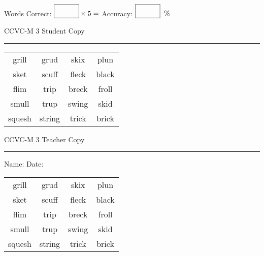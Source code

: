 \documentclass{memoir}
\begin{document}
\small

Words Correct: $\fbox{\phantom{\huge 100}} \times 5 = $ Accuracy: $\fbox{\phantom{\huge 100}}\;\; \%$ 

\vfill

\newpage


\footnotesize \noindent
CCVC-M 3 \hfill Student Copy
\smallskip
\hrule

\Large

\setlength{\tabcolsep}{14pt}
\def\arraystretch{3}

{\selectfont


\begin{vplace}[0.5]
\begin{center}
\begin{tabular}{cccc}
grill            & grud & skix & plun \\
sket & scuff & fleck             & black            \\
flim            & trip & breck       & froll \\
smull & trup       & swing & skid \\
squesh & string & trick & brick       \\
\end{tabular}
\end{center}
\end{vplace}

}

\newpage

\footnotesize \noindent
CCVC-M 3 \hfill Teacher Copy
\smallskip
\hrule

\small

\vfill

\noindent
Name: \underline{\hspace{1.75in}} \hfill Date: \underline{\hspace{1in}}

\Large

{\selectfont


\begin{vplace}[0.5]
\begin{center}
\begin{tabular}{cccc}
grill            & grud & skix & plun \\
sket & scuff & fleck             & black            \\
flim            & trip & breck       & froll \\
smull & trup       & swing & skid \\
squesh & string & trick & brick       \\
\end{tabular}
\end{center}
\end{vplace}



}
\end{document}
